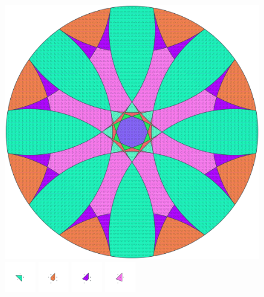 \documentclass[text.tex]{subfiles}
\begin{document}
\clearpage
\pagestyle{fancy}
\fancyhf{}
\begin{figure}[h!]
\centering
\includegraphics[width=1\textwidth]{img/results/circle8/circle8_209091_(3044_-1260alpha_1).pdf}
\includegraphics[width=0.12\textwidth]{img/results/circle8/circle8_209091_(3044_-1260alpha_1)_001.pdf}
\includegraphics[width=0.12\textwidth]{img/results/circle8/circle8_209091_(3044_-1260alpha_1)_002.pdf}
\includegraphics[width=0.12\textwidth]{img/results/circle8/circle8_209091_(3044_-1260alpha_1)_003.pdf}
\includegraphics[width=0.12\textwidth]{img/results/circle8/circle8_209091_(3044_-1260alpha_1)_004.pdf}

\end{figure}
\end{document}
